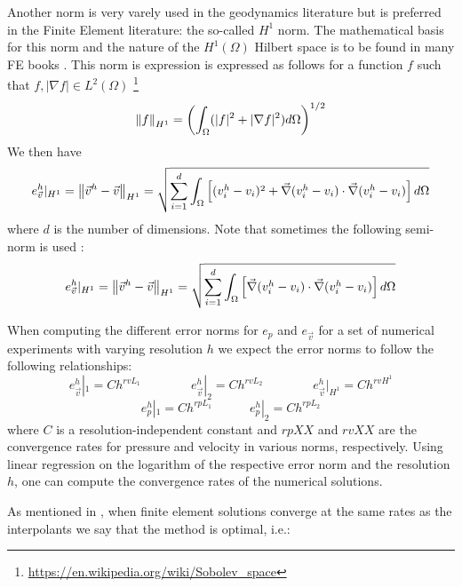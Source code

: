   
Another norm is very varely used in the geodynamics literature but is preferred in the 
Finite Element literature: the so-called $H^1$ norm. The mathematical basis for this
norm and the nature of the $H^1(\Omega)$ Hilbert space is to be found in many FE books \cite{dohu03,john16,hugh}.
This norm is expression is expressed as follows for a function $f$ such that $f,|\nabla f|\in L^2(\Omega)$
\footnote{\url{https://en.wikipedia.org/wiki/Sobolev_space}}
\begin{equation}
\left\lVert f\right\rVert_{H^1} = \left( \int_\Omega ( |f|^2 + |\nabla f|^2  ) d\Omega   \right)^{1/2}
\end{equation}
We then have 
\begin{equation}
e_{\vec v}^h|_{H^1} = \left\lVert\vec{v}^h-\vec{v}\right\rVert_{H^1} = \sqrt{
\sum\limits_{i=1}^d 
\int_\Omega  
\left[
({v}_i^h-{v}_i)^2
+
\vec\nabla(v_i^h-v_i)\cdot\vec\nabla(v_i^h-v_i) 
\right] d\Omega   
}
\end{equation}
where $d$ is the number of dimensions.
Note that sometimes the following semi-norm is used \cite{dobo04,bodg06}:
\begin{equation}
e_{\vec v}^h|_{H^1} = \left\lVert\vec{v}^h-\vec{v}\right\rVert_{H^1} = \sqrt{
\sum\limits_{i=1}^d 
\int_\Omega  
\left[
\vec\nabla(v_i^h-v_i)\cdot\vec\nabla(v_i^h-v_i) 
\right] d\Omega   
}
\end{equation}

When computing the different error norms for $e_p$ and $e_{\vec v}$ for a set of numerical experiments with
varying resolution $h$ we expect the error norms to follow the following relationships:
\begin{equation}
e_{\vec v}^h|_1 = C h^{rvL_1} 
\quad\quad\quad\quad
e_{\vec v}^h|_2 = C h^{rvL_2} 
\quad\quad\quad\quad 
e_{\vec v}^h|_{H^1} = C h^{rvH^1}
\end{equation}
\begin{equation}
e_p^h|_1 = C h^{rpL_1} 
\quad\quad\quad 
e_p^h|_2 = C h^{rpL_2}
\end{equation}
where $C$ is a resolution-independent constant
and $rpXX$ and $rvXX$ are the convergence rates for
pressure and velocity in various norms, respectively. 
Using linear regression on the logarithm of the respective error norm and the resolution $h$,
one can compute the convergence rates of the numerical solutions.

As mentioned in \cite{dobo04}, when finite element solutions converge at
the same rates as the interpolants we say that the method is optimal, i.e.:

